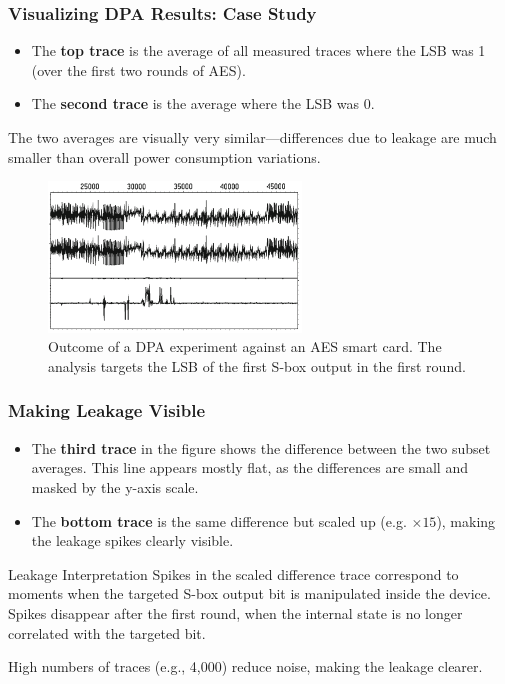 \begin{frame}
    \frametitle{Visualizing DPA Results: Case Study}

    

        \begin{itemize}
            \item The \textbf{top trace} is the average of all measured traces where the LSB was 1 (over the first two rounds of AES).
            \item The \textbf{second trace} is the average where the LSB was 0.
        \end{itemize}
        The two averages are visually very similar—differences due to leakage are much smaller than overall power consumption variations.

    \begin{figure}
        \centering
        \includegraphics[width=0.60\textwidth]{main thing/Pictures/DPA_classic.png}
        \caption{Outcome of a DPA experiment against an AES smart card. The analysis targets the LSB of the first S-box output in the first round.}
    \end{figure}
\end{frame}


\begin{frame}
    \frametitle{Making Leakage Visible}

    \begin{itemize}
        \item The \textbf{third trace} in the figure shows the difference between the two subset averages. This line appears mostly flat, as the differences are small and masked by the y-axis scale.
        \item The \textbf{bottom trace} is the same difference but scaled up (e.g. $\times 15$), making the leakage spikes clearly visible.
    \end{itemize}

    \begin{block}{Leakage Interpretation}
        Spikes in the scaled difference trace correspond to moments when the targeted S-box output bit is manipulated inside the device. Spikes disappear after the first round, when the internal state is no longer correlated with the targeted bit.
    \end{block}

    High numbers of traces (e.g., 4,000) reduce noise, making the leakage clearer.
\end{frame}

